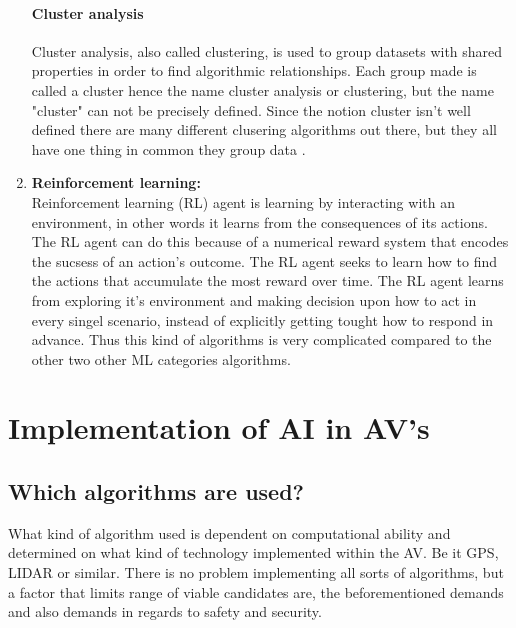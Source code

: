 \documentclass[conference]{IEEEtran}
\begin{document}
\begin{enumerate}
		       \paragraph{Cluster analysis}
		       Cluster analysis, also called clustering, is used to group datasets with shared properties in order to find algorithmic relationships. Each group made is
		       called a cluster hence the name cluster analysis or clustering, but the name "cluster" can not be precisely defined. Since the notion cluster isn't well defined
		       there are many different clusering algorithms out there, but they all have one thing in common they group data \cite{wiki:CA}.

		 \item \textbf{Reinforcement learning:}\\
		       Reinforcement learning (RL) agent is learning by interacting with an environment, in other words it learns from the consequences of its actions. The RL agent can
		       do this because of a numerical reward system that encodes the sucsess of an action's outcome. The RL agent seeks to learn how to find the actions that accumulate the
			   most reward over time. The RL agent learns from exploring it's environment and making decision upon how to act in every singel scenario, instead of explicitly getting tought
			   how to respond in advance. Thus this kind of algorithms is very complicated compared to the other two other ML categories algorithms. 

	 \end{enumerate}

\section{Implementation of AI in AV's}
 \subsection{Which algorithms are used?}
	 What kind of algorithm used is dependent on computational ability and determined on what kind of technology
	 implemented within the AV. Be it GPS, LIDAR or similar. There is no problem
	 implementing all sorts of algorithms, but a factor that limits range of viable candidates
	 are, the beforementioned demands and also demands in regards to safety and security.
\end{document}
